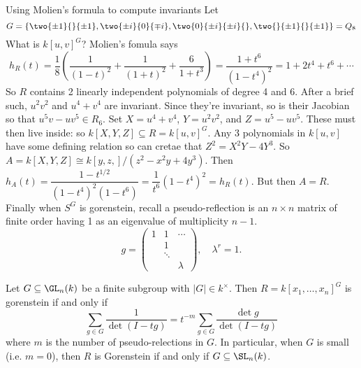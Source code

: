 

\begin{ex} Using Molien's formula to compute invariants
Let 
	\[
	G= \left\{ \two{\pm 1}{}{\pm 1}, \two{\pm i}{0}{\mp i}, \two{0}{\pm i}{\pm i}{}, \two{}{\pm 1}{}{\pm1} \right\} = Q_8
	\]
What is $k[u,v]^G$? Molien's fomula says
	\[
	h_R(t) = \dfrac{1}{8} \left( \dfrac{1}{(1-t)^2} + \dfrac{1}{(1+t)^2} + \dfrac{6}{1+t^3} \right)= \dfrac{1+t^6}{(1-t^4)^2}= 1 + 2 t^4 + t^6 + \cdots
	\]
So $R$ contains 2 linearly independent polynomials of degree 4 and 6. After a brief such, $u^2v^2$ and $u^4+v^4$ are invariant. Since they're invariant, so is their Jacobian so that $u^5v - uv^5 \in R_6$. Set $X= u^4+v^4$, $Y= u^2v^2$, and $Z= u^5-uv^5$. These must then live inside: so $k[X,Y,Z] \subseteq R = k[u,v]^G$. Any 3 polynomials in $k[u,v]$ have some defining relation so can cretae that $Z^2 = X^2Y-4Y^3$. So $A= k[X,Y,Z] \cong k[y,z,]/(z^2-x^2y+4y^3)$. Then $h_A(t)= \dfrac{1-t^{1/2}}{(1-t^4)^2(1-t^6)} = \dfrac{1}{t^6}{(1-t^4)^2} = h_R(t)$. But then $A=R$. Finally when $S^G$ is gorenstein, recall a pseudo-reflection is an $n \times n$ matrix of finite order having 1 as an eigenvalue of multiplicity $n-1$.
	\[
	g= \begin{pmatrix}
	1 & 1 & \cdots \\
	& 1 & \\
	& \ddots &  \\
	& & \lambda
	\end{pmatrix}, \quad \lambda^r=1.
	\]
\end{ex}





\begin{thm}
Let $G \subseteq \GL_n(k)$ be a finite subgroup with $|G| \in k^\times$. Then $R= k[x_1,\ldots,x_n]^G$ is gorenstein if and only if
	\[
	\sum_{g \in G} \dfrac{1}{\det(I-tg)}= t^{-m} \sum_{g \in G} \dfrac{\det g}{\det(I-tg)}
	\]
where $m$ is the number of pseudo-relections in $G$. In particular, when $G$ is small (i.e. $m=0$), then $R$ is Gorenstein if and only if $G \subseteq \SL_n(k)$.
\end{thm}


